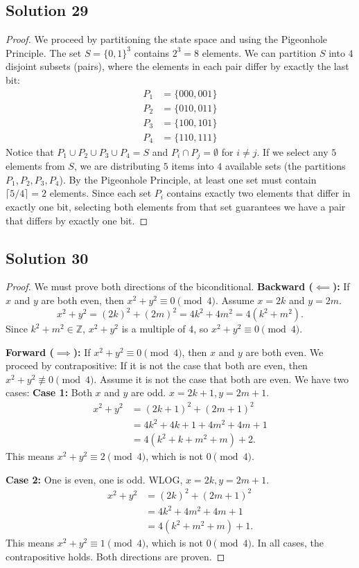 \documentclass[11pt]{article}
\begin{document}
\subsection{Solution 29}
\begin{proof}
We proceed by partitioning the state space and using the Pigeonhole Principle. The set $S = \{0,1\}^3$ contains $2^3 = 8$ elements.
We can partition $S$ into $4$ disjoint subsets (pairs), where the elements in each pair differ by exactly the last bit:
\begin{align*}
P_1 &= \{000, 001\} \\
P_2 &= \{010, 011\} \\
P_3 &= \{100, 101\} \\
P_4 &= \{110, 111\}
\end{align*}
Notice that $P_1 \cup P_2 \cup P_3 \cup P_4 = S$ and $P_i \cap P_j = \emptyset$ for $i \neq j$.
If we select any $5$ elements from $S$, we are distributing $5$ items into $4$ available sets (the partitions $P_1, P_2, P_3, P_4$).
By the Pigeonhole Principle, at least one set must contain $\lceil 5/4 \rceil = 2$ elements.
Since each set $P_i$ contains exactly two elements that differ in exactly one bit, selecting both elements from that set guarantees we have a pair that differs by exactly one bit.
\end{proof}

\subsection{Solution 30}
\begin{proof}
We must prove both directions of the biconditional.
\textbf{Backward ($\impliedby$):} If $x$ and $y$ are both even, then $x^2 + y^2 \equiv 0 \pmod 4$.
Assume $x = 2k$ and $y = 2m$.
\[ x^2 + y^2 = (2k)^2 + (2m)^2 = 4k^2 + 4m^2 = 4(k^2 + m^2). \]
Since $k^2 + m^2 \in \mathbb{Z}$, $x^2 + y^2$ is a multiple of $4$, so $x^2 + y^2 \equiv 0 \pmod 4$.

\textbf{Forward ($\implies$):} If $x^2 + y^2 \equiv 0 \pmod 4$, then $x$ and $y$ are both even.
We proceed by contrapositive: If it is not the case that both are even, then $x^2 + y^2 \not\equiv 0 \pmod 4$.
Assume it is not the case that both are even. We have two cases:
\textbf{Case 1:} Both $x$ and $y$ are odd. $x = 2k+1, y = 2m+1$.
\begin{align*}
x^2 + y^2 &= (2k+1)^2 + (2m+1)^2 \\
&= 4k^2 + 4k + 1 + 4m^2 + 4m + 1 \\
&= 4(k^2 + k + m^2 + m) + 2.
\end{align*}
This means $x^2 + y^2 \equiv 2 \pmod 4$, which is not $0 \pmod 4$.

\textbf{Case 2:} One is even, one is odd. WLOG, $x = 2k, y = 2m+1$.
\begin{align*}
x^2 + y^2 &= (2k)^2 + (2m+1)^2 \\
&= 4k^2 + 4m^2 + 4m + 1 \\
&= 4(k^2 + m^2 + m) + 1.
\end{align*}
This means $x^2 + y^2 \equiv 1 \pmod 4$, which is not $0 \pmod 4$.
In all cases, the contrapositive holds. Both directions are proven.
\end{proof}
\end{document}
